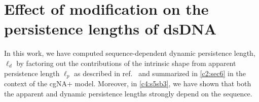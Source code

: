\section{Effect of \cpg modification on the persistence lengths of dsDNA} 
In this work, we have computed sequence-dependent dynamic persistence length, $\ell_{d}$ by factoring out the contributions of the intrinsic shape from apparent persistence length $\ell_{p}$ as described in ref.~\cite{cgdnamc} and summarized in \cref{c2:sec6} in the context of the cgNA$+$ model.
Moreover, in \cref{c4:s5sb3}, we have shown that both the apparent and dynamic persistence lengths strongly depend on the sequence. 

